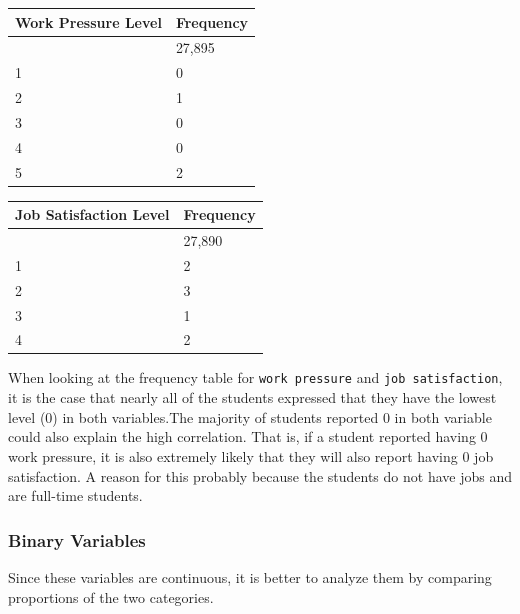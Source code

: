 \documentclass[
  letterpaper,
  DIV=11,
  numbers=noendperiod]{scrartcl}
\newenvironment{Shaded}{\begin{snugshade}}{\end{snugshade}}
\newcommand{\FunctionTok}[1]{\textcolor[rgb]{0.28,0.35,0.67}{#1}}
\newcommand{\NormalTok}[1]{\textcolor[rgb]{0.00,0.23,0.31}{#1}}
\newcommand{\SpecialCharTok}[1]{\textcolor[rgb]{0.37,0.37,0.37}{#1}}
\begin{document}
\begin{Shaded}
\end{Shaded}

\begin{longtable}[]{@{}ll@{}}
\toprule\noalign{}
Work Pressure Level & Frequency \\
\midrule\noalign{}
\endhead
\bottomrule\noalign{}
\endlastfoot
0 & 27,895 \\
1 & 0 \\
2 & 1 \\
3 & 0 \\
4 & 0 \\
5 & 2 \\
\end{longtable}

\begin{longtable}[]{@{}ll@{}}
\toprule\noalign{}
Job Satisfaction Level & Frequency \\
\midrule\noalign{}
\endhead
\bottomrule\noalign{}
\endlastfoot
0 & 27,890 \\
1 & 2 \\
2 & 3 \\
3 & 1 \\
4 & 2 \\
\end{longtable}

When looking at the frequency table for \texttt{work\ pressure} and
\texttt{job\ satisfaction}, it is the case that nearly all of the
students expressed that they have the lowest level (0) in both
variables.The majority of students reported 0 in both variable could
also explain the high correlation. That is, if a student reported having
0 work pressure, it is also extremely likely that they will also report
having 0 job satisfaction. A reason for this probably because the
students do not have jobs and are full-time students.

\subsubsection{Binary Variables}\label{binary-variables}

Since these variables are continuous, it is better to analyze them by
comparing proportions of the two categories.
\end{document}
